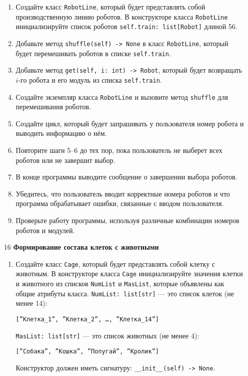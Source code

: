 \begin{enumerate}
\begin{enumerate}
    \item Создайте класс \texttt{RobotLine}, который будет представлять собой производственную линию роботов. В конструкторе класса \texttt{RobotLine} инициализируйте список роботов \texttt{self.train: list[Robot]} длиной 56.

    \item Добавьте метод \texttt{shuffle(self) -> None} в класс \texttt{RobotLine}, который будет перемешивать роботов в списке \texttt{self.train}.

    \item Добавьте метод \texttt{get(self, i: int) -> Robot}, который будет возвращать $i$-го робота и его модуль из списка \texttt{self.train}.

    \item Создайте экземпляр класса \texttt{RobotLine} и вызовите метод \texttt{shuffle} для перемешивания роботов.

    \item Создайте цикл, который будет запрашивать у пользователя номер робота и выводить информацию о нём.

    \item Повторите шаги 5–6 до тех пор, пока пользователь не выберет всех роботов или не завершит выбор.

    \item В конце программы выводите сообщение о завершении выбора роботов.

    \item Убедитесь, что пользователь вводит корректные номера роботов и что программа обрабатывает ошибки, связанные с вводом пользователя.

    \item Проверьте работу программы, используя различные комбинации номеров роботов и модулей.
\end{enumerate}

\item[16] \textbf{Формирование состава клеток с животными}
\begin{enumerate}
    \item Создайте класс \texttt{Cage}, который будет представлять собой клетку с животным. В конструкторе класса \texttt{Cage} инициализируйте значения клетки и животного из списков \texttt{NumList} и \texttt{MasList}, которые объявлены как общие атрибуты класса. \texttt{NumList: list[str]} — это список клеток (не менее 14): 
    \begin{center}
        \texttt{[''Клетка\_1'', ''Клетка\_2'', \dots, ''Клетка\_14'']}
    \end{center}
    \texttt{MasList: list[str]} — это список животных (не менее 4):
    \begin{center}
        \texttt{[''Собака'', ''Кошка'', ''Попугай'', ''Кролик'']}
    \end{center}
    Конструктор должен иметь сигнатуру: \texttt{\_\_init\_\_(self) -> None}.


\end{enumerate}
\end{enumerate}
